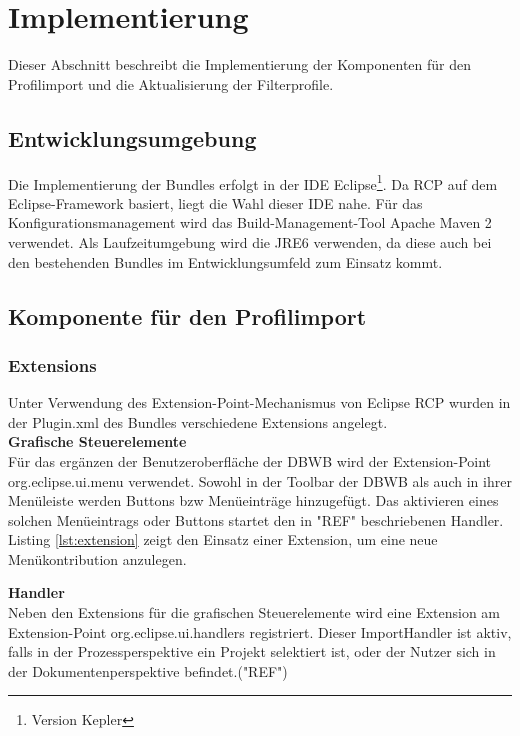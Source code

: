 {{}

\section{Implementierung}{
\label{sec:implementierung}
Dieser Abschnitt beschreibt die Implementierung der Komponenten für den Profilimport und die Aktualisierung der Filterprofile.

\subsection{Entwicklungsumgebung}{
Die Implementierung der Bundles erfolgt in der \ac{IDE} Eclipse\footnote{Version Kepler}. Da \ac{RCP} auf dem Eclipse-Framework basiert, liegt die Wahl dieser \ac{IDE} nahe. Für das Konfigurationsmanagement wird das Build-Management-Tool Apache Maven 2 verwendet. Als Laufzeitumgebung wird die \ac{JRE}6 verwenden, da diese auch bei den bestehenden Bundles im Entwicklungsumfeld zum Einsatz kommt.
}




\subsection{Komponente für den Profilimport}{
\label{sec:impl_import}

\subsubsection{Extensions}{
Unter Verwendung des Extension-Point-Mechanismus von Eclipse \ac{RCP} wurden in der Plugin.xml des Bundles verschiedene Extensions angelegt.
\\
\textbf{Grafische Steuerelemente}\\
Für das ergänzen der Benutzeroberfläche der \ac {DBWB} wird der Extension-Point org.eclipse.ui.menu verwendet. Sowohl in der Toolbar der \ac{DBWB} als auch in ihrer Menüleiste werden Buttons bzw Menüeinträge hinzugefügt. Das aktivieren eines solchen Menüeintrags oder Buttons startet den in "REF" beschriebenen Handler. Listing \ref{lst:extension} zeigt den Einsatz einer Extension, um eine neue Menükontribution anzulegen.

\textbf{Handler}{
\\
Neben den Extensions für die grafischen Steuerelemente wird eine Extension am Extension-Point org.eclipse.ui.handlers registriert. Dieser ImportHandler ist aktiv, falls in der Prozessperspektive ein Projekt selektiert ist, oder der Nutzer sich in der Dokumentenperspektive befindet.("REF") 
}

}}}}

